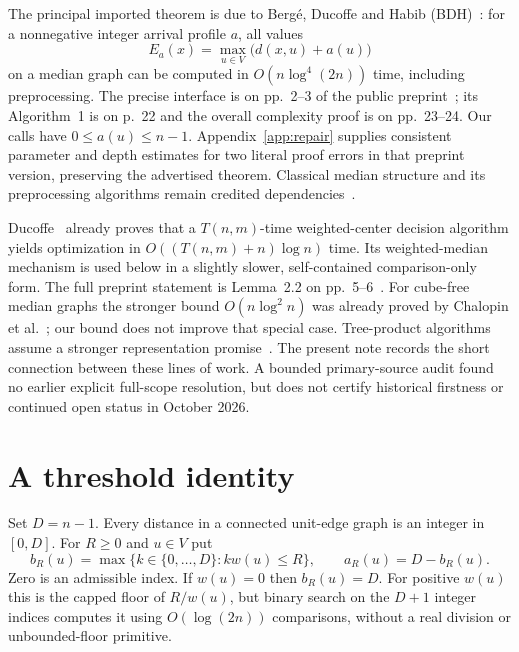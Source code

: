 \documentclass[11pt]{article}
\begin{document}
The principal imported theorem is due to Berg\'e, Ducoffe and Habib
(BDH)~\cite{BDH}: for a nonnegative integer arrival profile $a$, all values
\begin{equation}\label{eq:additive}
 E_a(x)=\max_{u\in V}\bigl(d(x,u)+a(u)\bigr)
\end{equation}
on a median graph can be computed in $O(n\log^4(2n))$ time, including
preprocessing. The precise interface is on pp.~2--3 of the public
preprint~\cite{BDHarxiv}; its Algorithm~1 is on p.~22 and the overall
complexity proof is on pp.~23--24. Our calls have $0\leq a(u)\leq n-1$.
Appendix~\ref{app:repair} supplies consistent parameter and depth estimates
for two literal proof errors in that preprint version, preserving the
advertised theorem. Classical median structure and its preprocessing
algorithms remain credited dependencies~\cite{BDHarxiv,Median}.

Ducoffe~\cite[Lemma~2, p.~133:6]{D26} already proves that a $T(n,m)$-time
weighted-center decision algorithm yields optimization in
$O((T(n,m)+n)\log n)$ time. Its weighted-median mechanism is used below
in a slightly slower, self-contained comparison-only form. The full
preprint statement is Lemma~2.2 on pp.~5--6~\cite{D26arxiv}.
For cube-free median graphs the stronger bound $O(n\log^2 n)$ was already
proved by Chalopin et al.~\cite[Theorem~7.8, p.~28]{CCDDV}; our bound does
not improve that special case. Tree-product algorithms assume a stronger
representation promise~\cite{Trees,OWR}. The present note records the
short connection between these lines of work. A bounded primary-source
audit found no earlier explicit full-scope resolution, but does not
certify historical firstness or continued open status in October 2026.

\section{A threshold identity}
Set $D=n-1$. Every distance in a connected unit-edge graph is an integer
in $[0,D]$. For $R\geq0$ and $u\in V$ put
\begin{equation}\label{eq:budget}
 b_R(u)=\max\{k\in\{0,\ldots,D\}:k w(u)\leq R\},
 \qquad a_R(u)=D-b_R(u).
\end{equation}
Zero is an admissible index. If $w(u)=0$ then $b_R(u)=D$.
For positive $w(u)$ this is the capped floor of $R/w(u)$, but binary
search on the $D+1$ integer indices computes it using $O(\log(2n))$
comparisons, without a real division or unbounded-floor primitive.
\end{document}
